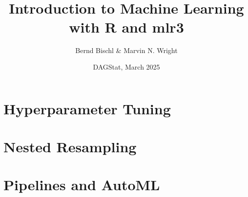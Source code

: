\documentclass[13pt,compress]{beamer}
\title{Introduction to Machine Learning\\with R and mlr3}
\author{Bernd Bischl \& Marvin N. Wright}
\date{DAGStat, March 2025}
\begin{document}


\frame{\titlepage}

\section{Hyperparameter Tuning}




%
\section{Nested Resampling}




\section{Pipelines and AutoML}

\end{document}
